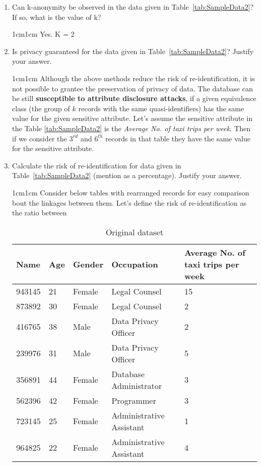 \documentclass[11pt,letterpaper]{article}
\newenvironment{answer}{\em \color{blue} \begin{adjustwidth}{1cm}{1cm}}{\end{adjustwidth}}
\begin{document}
\begin{enumerate}
		\item Can k-anonymity be observed in the data given in Table~\ref{tab:SampleData2}? If so, what is the value of k?
		
		\begin{answer}
			Yes. K = 2
		\end{answer}
		
		\item Is privacy guaranteed for the data given in Table~\ref{tab:SampleData2}? Justify your answer.
		
		\begin{answer}
			Although the above methods reduce the risk of re-identification, it is not possible to grantee the preservation of privacy of data. The database can be still \textbf{susceptible to attribute disclosure attacks}, if a given equivalence class (the group of $k$ records with the same quasi-identifiers) has the same value for the given sensitive attribute. Let's assume the sensitive attribute in the Table \ref{tab:SampleData2} is the \textit{Average No. of taxi trips per week}. Then if we consider the $3^{rd}$ and $6^{th}$ records in that table they have the same value for the sensitive attribute. 
		\end{answer}
		
		\pagebreak
		\item Calculate the risk of re-identification for data given in Table~\ref{tab:SampleData2} (mention as a percentage). Justify your answer.
		
		\begin{answer}
			Consider below tables with rearranged records for easy comparison bout the linkages between them. Let's define the risk of re-identification as the ratio between 
			
			\begin{table}[h!]
				\caption{Original dataset}
				\begin{tabularx}{\columnwidth}{|p{2cm}|p{2cm}|p{3cm}|X|X|}
					\hline
					\textbf{Name} & \textbf{Age} & \textbf{Gender}  & \textbf{Occupation}  & \textbf{Average No. of taxi trips per week} \\\hline
					943145 & 21 & Female & Legal Counsel & 15\\\hline
					873892 & 30 & Female & Legal Counsel & 2\\ \hline
					\hline
					416765 & 38 & Male & Data Privacy Officer & 2 \\\hline
					239976 & 31 & Male & Data Privacy Officer & 5 \\\hline
					\hline			
					356891 & 44 & Female & Database Administrator & 3 \\ \hline
					562396 & 42 & Female & Programmer & 3\\ \hline
					\hline									
					723145 & 25 & Female & Administrative 
					Assistant & 1\\\hline
					964825 & 22 & Female & Administrative 
					Assistant & 4 \\ \hline																																					
				\end{tabularx}
			\end{table}
			

\end{answer}
\end{enumerate}
\end{document}

